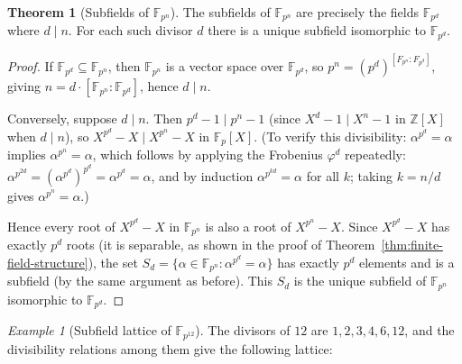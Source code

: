 \documentclass[12pt,a4paper,openany]{book}
\theoremstyle{definition}
\newtheorem{theorem}{Theorem}[chapter]
\theoremstyle{remark}
\newtheorem{example}{Example}[chapter]
\newcommand{\Z}{\mathbb{Z}}
\newcommand{\F}{\mathbb{F}}
\begin{document}
\begin{theorem}[Subfields of $\F_{p^n}$]
\label{thm:subfields-Fpn}
The subfields of $\F_{p^n}$ are precisely the fields $\F_{p^d}$ where
$d \mid n$. For each such divisor $d$ there is a unique subfield
isomorphic to $\F_{p^d}$.
\end{theorem}

\begin{proof}
If $\F_{p^d} \subseteq \F_{p^n}$, then $\F_{p^n}$ is a vector space
over $\F_{p^d}$, so $p^n = (p^d)^{[F_{p^n}:F_{p^d}]}$, giving
$n = d \cdot [\F_{p^n}:\F_{p^d}]$, hence $d \mid n$.

Conversely, suppose $d \mid n$. Then $p^d - 1 \mid p^n - 1$ (since
$X^d - 1 \mid X^n - 1$ in $\Z[X]$ when $d \mid n$), so
$X^{p^d} - X \mid X^{p^n} - X$ in $\F_p[X]$. (To verify this
divisibility: $\alpha^{p^d} = \alpha$ implies $\alpha^{p^n} = \alpha$,
which follows by applying the Frobenius $\varphi^d$ repeatedly:
$\alpha^{p^{2d}} = (\alpha^{p^d})^{p^d} = \alpha^{p^d} = \alpha$,
and by induction $\alpha^{p^{kd}} = \alpha$ for all $k$; taking
$k = n/d$ gives $\alpha^{p^n} = \alpha$.)

Hence every root of $X^{p^d} - X$ in $\F_{p^n}$ is also a root of
$X^{p^n} - X$. Since $X^{p^d} - X$ has exactly $p^d$ roots (it is
separable, as shown in the proof of
Theorem~\ref{thm:finite-field-structure}), the set
$S_d = \{\alpha \in \F_{p^n} : \alpha^{p^d} = \alpha\}$ has exactly
$p^d$ elements and is a subfield (by the same argument as before).
This $S_d$ is the unique subfield of $\F_{p^n}$ isomorphic to
$\F_{p^d}$.
\end{proof}

\begin{example}[Subfield lattice of $\F_{p^{12}}$]
\label{ex:subfield-lattice-p12}
\index{subfield lattice!of $\F_{p^{12}}$}
The divisors of $12$ are $1, 2, 3, 4, 6, 12$, and the divisibility
relations among them give the following lattice:
\end{example}

\begin{center}
\end{center}
\end{document}
